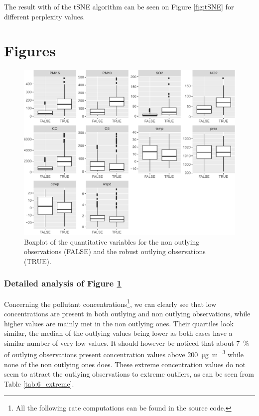 \documentclass[a4paper, 12pt]{article}
\begin{document}
    The result with of the tSNE algorithm can be seen on Figure \ref{fig:tSNE} for different perplexity values.
    
    \newpage
    
    \printbibliography
    
    \newpage
    \appendix
    
    \section{Figures} \label{appendix_fig}
    
    \begin{figure}[H]
        \centering
        \includegraphics[width = \textwidth]{resources/pdf/boxplots_outliers.pdf}
        \caption{Boxplot of the quantitative variables for the non outlying observations (FALSE) and the robust outlying observations (TRUE).}
        \label{fig:boxplots_outliers}
    \end{figure}
    
    \subsubsection*{Detailed analysis of Figure \ref{fig:boxplots_outliers}}
    
    Concerning the pollutant concentrations\footnote{All the following rate computations can be found in the source code.}, we can clearly see that low  concentrations are present in both outlying and non outlying observations, while higher values are mainly met in the non outlying ones. Their quartiles look similar, the median of the outlying values being lower as both cases have a similar number of very low values. It should however be noticed that about \SI{7}{\percent} of outlying observations present concentration values above \SI{200}{\micro\gram\per\meter\cubed} while none of the non outlying ones does. These extreme concentration values do not seem to attract the outlying observations to extreme outliers, as can be seen from Table \ref{tab:6_extreme}.
    
\end{document}
